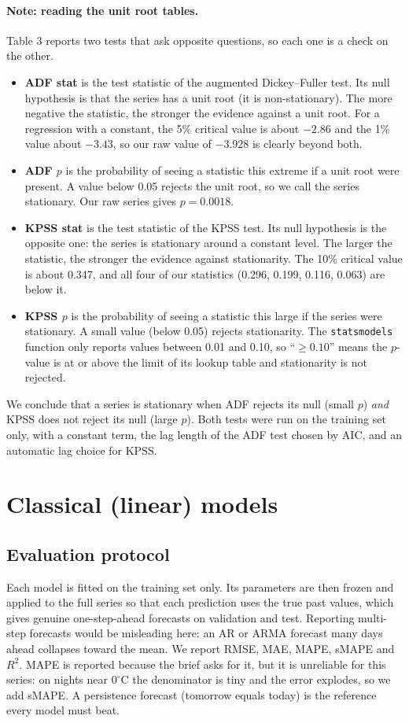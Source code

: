 \documentclass[11pt,a4paper]{article}
\begin{document}
\paragraph{Note: reading the unit root tables.}
Table 3 reports two tests that ask opposite questions, so each one is a check on the other.
\begin{itemize}
  \item \textbf{ADF stat} is the test statistic of the augmented Dickey--Fuller test. Its null hypothesis is that the series has a unit root (it is non-stationary). The more negative the statistic, the stronger the evidence against a unit root. For a regression with a constant, the 5\% critical value is about $-2.86$ and the 1\% value about $-3.43$, so our raw value of $-3.928$ is clearly beyond both.
  \item \textbf{ADF $p$} is the probability of seeing a statistic this extreme if a unit root were present. A value below 0.05 rejects the unit root, so we call the series stationary. Our raw series gives $p=0.0018$.
  \item \textbf{KPSS stat} is the test statistic of the KPSS test. Its null hypothesis is the opposite one: the series is stationary around a constant level. The larger the statistic, the stronger the evidence against stationarity. The 10\% critical value is about 0.347, and all four of our statistics (0.296, 0.199, 0.116, 0.063) are below it.
  \item \textbf{KPSS $p$} is the probability of seeing a statistic this large if the series were stationary. A small value (below 0.05) rejects stationarity. The \texttt{statsmodels} function only reports values between 0.01 and 0.10, so ``$\ge 0.10$'' means the $p$-value is at or above the limit of its lookup table and stationarity is not rejected.
\end{itemize}
We conclude that a series is stationary when ADF rejects its null (small $p$) \emph{and} KPSS does not reject its null (large $p$). Both tests were run on the training set only, with a constant term, the lag length of the ADF test chosen by AIC, and an automatic lag choice for KPSS.

\section{Classical (linear) models}\label{classical-orders}
\subsection{Evaluation protocol}
Each model is fitted on the training set only. Its parameters are then frozen and applied to the full series so that each prediction uses the true past values, which gives genuine one-step-ahead forecasts on validation and test. Reporting multi-step forecasts would be misleading here: an AR or ARMA forecast many days ahead collapses toward the mean. We report RMSE, MAE, MAPE, sMAPE and $R^2$. MAPE is reported because the brief asks for it, but it is unreliable for this series: on nights near $0^\circ$C the denominator is tiny and the error explodes, so we add sMAPE. A persistence forecast (tomorrow equals today) is the reference every model must beat.
\end{document}
